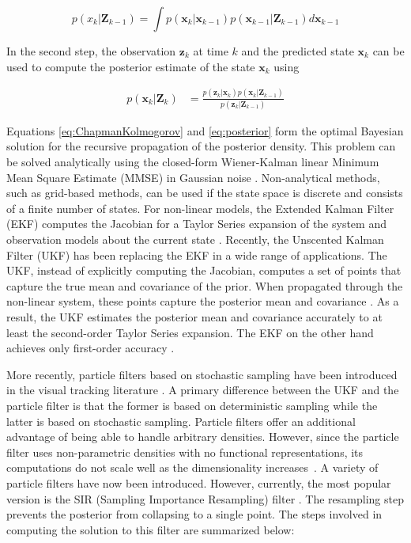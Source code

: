 \documentclass[12pt,letterpaper,doublespaced,ETD]{gt-ece-thesis} %
\begin{document}
\begin{Body}
\begin{equation}
p(x_k|\textbf{Z}_{k-1})=
\int{p(\mathbf{x}_k| \mathbf{x}_{k-1})p(\mathbf{x}_{k-1}|\mathbf{Z}_{k-1})}d\mathbf{x}_{k-1}
\label{eq:ChapmanKolmogorov}
\end{equation}  

In the second step, the observation $\mathbf{z}_k$ at time $k$ and the predicted state $\mathbf{x}_k$ can be used to compute the posterior estimate of the state $\mathbf{x}_k$ using 

\begin{align}
	p(\mathbf{x}_k|\textbf{Z}_k)	&= \frac{p(\mathbf{z}_k|\mathbf{x}_k)p(\mathbf{x}_k |\textbf{Z}_{k-1})   }{p(\mathbf{z}_k| \textbf{Z}_{k-1})}
\label{eq:posterior}			
\end{align}

Equations \ref{eq:ChapmanKolmogorov} and \ref{eq:posterior} form the optimal Bayesian solution for the recursive propagation of the posterior density.  This problem can be solved analytically using the closed-form Wiener-Kalman linear Minimum Mean Square Estimate (MMSE) in Gaussian noise \cite{1964_JNL_BayesianEstimation_Ho, 1993_BOOK_SSP_Kay}.  Non-analytical methods, such as grid-based methods, can be used if the state space is discrete and consists of a finite number of states.  For non-linear models, the Extended Kalman Filter (EKF) computes the Jacobian for a Taylor Series expansion of the system and observation models about the current state \cite{2005_Misc_KalmanFilterComparison_Orderud}.  Recently, the Unscented Kalman Filter (UKF) has been replacing the EKF in a wide range of applications.  The UKF, instead of explicitly computing the Jacobian, computes a set of points that capture the true mean and covariance of the prior.  When propagated through the non-linear system, these points capture the posterior mean and covariance \cite{1997_CNF_UKF_Julier}.  As a result, the UKF estimates the posterior mean and covariance accurately to at least the second-order Taylor Series expansion.  The EKF on the other hand achieves only first-order accuracy \cite{2004_CNF_SigmaPointKalman_Merwe, 2000_CNF_UKF_Wan}.  

More recently, particle filters based on stochastic sampling have been introduced in the visual tracking literature \cite{1993_JNL_ParticleFilter_Gordon, 2001_JNL_PFjumpMarkov_Doucet}.  A primary difference between the UKF and the particle filter is that the former is based on deterministic sampling while the latter is based on stochastic sampling.  Particle filters offer an additional advantage of being able to handle arbitrary densities.  However, since the particle filter uses non-parametric densities with no functional representations, its computations do not scale well as the dimensionality increases~\cite{2004_CNF_TrackingPeople_Zhao}.  A variety of particle filters have now been introduced.  However, currently, the most popular version is the SIR (Sampling Importance Resampling) filter \cite{2009_BOOK_PF_Doucet}.  The resampling step prevents the posterior from collapsing to a single point.  The steps involved in computing the solution to this filter are summarized below:


\end{Body}
\end{document}
